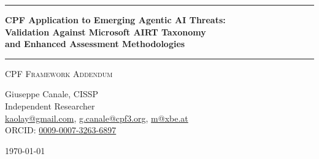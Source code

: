\documentclass[11pt,a4paper]{article}
\begin{document}
\thispagestyle{empty}
\begin{center}

\vspace*{0.5cm}

\rule{\textwidth}{1.5pt}

\vspace{0.5cm}

{\LARGE \textbf{CPF Application to Emerging Agentic AI Threats:}}\\[0.3cm]
{\LARGE \textbf{Validation Against Microsoft AIRT Taxonomy}}\\[0.3cm]
{\LARGE \textbf{and Enhanced Assessment Methodologies}}

\vspace{0.5cm}

\rule{\textwidth}{1.5pt}

\vspace{0.3cm}

{\large \textsc{CPF Framework Addendum}}

\vspace{0.5cm}

{\Large Giuseppe Canale, CISSP}\\[0.2cm]
Independent Researcher\\[0.1cm]
\href{mailto:kaolay@gmail.com}{kaolay@gmail.com}, 
\href{mailto:g.canale@cpf3.org}{g.canale@cpf3.org}, 
\href{mailto:m8xbe.at}{m@xbe.at}\\[0.1cm]
ORCID: \href{https://orcid.org/0009-0007-3263-6897}{0009-0007-3263-6897}

\vspace{0.8cm}

{\large \today}

\vspace{1cm}

\end{center}
\end{document}
